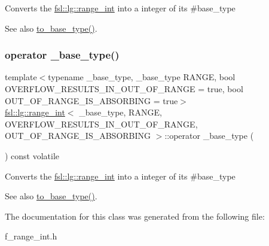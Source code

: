 Converts the \mbox{\hyperlink{classfsl_1_1lg_1_1range__int}{fsl\+::lg\+::range\+\_\+int}} into a integer of its \#base\+\_\+type \begin{DoxySeeAlso}{See also}
\mbox{\hyperlink{classfsl_1_1lg_1_1range__int_ac34c6bfd6650ef7bce0f4f5be588d379}{to\+\_\+base\+\_\+type()}}. 
\end{DoxySeeAlso}
\mbox{\label{classfsl_1_1lg_1_1range__int_a0ccee23a812d577e62cedf54d5633792}} 
\subsubsection{\texorpdfstring{operator \_base\_type()}{operator \_base\_type()}\hspace{0.1cm}{\footnotesize\ttfamily [2/2]}}
{\footnotesize\ttfamily template$<$typename \+\_\+base\+\_\+type, \+\_\+base\+\_\+type R\+A\+N\+GE, bool O\+V\+E\+R\+F\+L\+O\+W\+\_\+\+R\+E\+S\+U\+L\+T\+S\+\_\+\+I\+N\+\_\+\+O\+U\+T\+\_\+\+O\+F\+\_\+\+R\+A\+N\+GE = true, bool O\+U\+T\+\_\+\+O\+F\+\_\+\+R\+A\+N\+G\+E\+\_\+\+I\+S\+\_\+\+A\+B\+S\+O\+R\+B\+I\+NG = true$>$ \\
\mbox{\hyperlink{classfsl_1_1lg_1_1range__int}{fsl\+::lg\+::range\+\_\+int}}$<$ \+\_\+base\+\_\+type, R\+A\+N\+GE, O\+V\+E\+R\+F\+L\+O\+W\+\_\+\+R\+E\+S\+U\+L\+T\+S\+\_\+\+I\+N\+\_\+\+O\+U\+T\+\_\+\+O\+F\+\_\+\+R\+A\+N\+GE, O\+U\+T\+\_\+\+O\+F\+\_\+\+R\+A\+N\+G\+E\+\_\+\+I\+S\+\_\+\+A\+B\+S\+O\+R\+B\+I\+NG $>$\+::operator \+\_\+base\+\_\+type (\begin{DoxyParamCaption}{ }\end{DoxyParamCaption}) const volatile\hspace{0.3cm}{\ttfamily [inline]}}

Converts the \mbox{\hyperlink{classfsl_1_1lg_1_1range__int}{fsl\+::lg\+::range\+\_\+int}} into a integer of its \#base\+\_\+type \begin{DoxySeeAlso}{See also}
\mbox{\hyperlink{classfsl_1_1lg_1_1range__int_ac34c6bfd6650ef7bce0f4f5be588d379}{to\+\_\+base\+\_\+type()}}. 
\end{DoxySeeAlso}


The documentation for this class was generated from the following file\+:\begin{DoxyCompactItemize}
\item 
f\+\_\+range\+\_\+int.\+h\end{DoxyCompactItemize}
